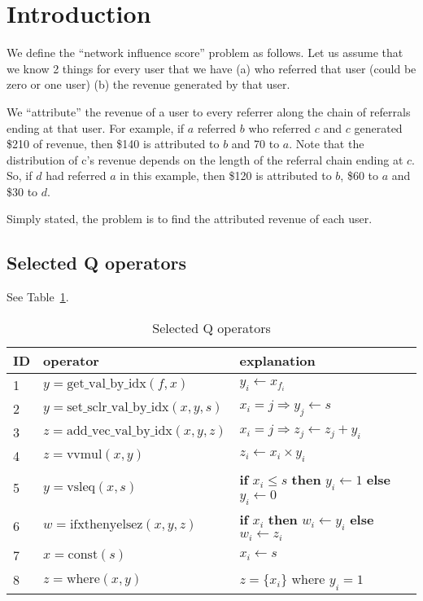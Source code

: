 \section{Introduction}

We define the ``network influence score'' problem as follows. Let us assume that
we know 2 things for every user that we have (a) who referred that user (could
be zero or one user) (b) the revenue generated by that user. 

We ``attribute''
the revenue of a user to every referrer along the chain of referrals ending at
that user. For example, if \(a\) referred \(b\) who referred \(c\) and \(c\)
generated \$210 of revenue, then \$140 is attributed to \(b\) and 70 to \(a\).
Note that the distribution of c's revenue depends on the length of the referral
chain ending at \(c\). So, if \(d\) had referred \(a\) in this example, then
\$120 is attributed to \(b\), \$60 to \(a\) and \$30 to \(d\). 

Simply stated, the problem is to find the attributed revenue of each user.

\subsection{Selected Q operators}
See Table~\ref{tbl_q_ops}.

\begin{table}[ht]
\centering
\begin{tabular}{|l|l|l|} \hline \hline
{\bf ID} & {\bf operator} & {\bf explanation} \\ \hline \hline
1 & \(y = \mathrm{get\_val\_by\_idx}(f, x)\) & \(y_i \leftarrow x_{f_i}\) \\ \hline
2 & \(y = \mathrm{set\_sclr\_val\_by\_idx}(x, y, s)\) & \(x_i = j \Rightarrow y_j \leftarrow s\) \\ \hline
3 & \(z = \mathrm{add\_vec\_val\_by\_idx}(x, y, z)\) & \(x_i = j \Rightarrow z_j \leftarrow
z_j + y_i\) \\ \hline
4 & \(z = \mathrm{vvmul}(x, y)\) & \(z_i \leftarrow x_i \times y_i\) \\ \hline
5 & \(y = \mathrm{vsleq}(x, s)\) & {\bf if} \(x_i \leq s\) {\bf then} \(y_i \leftarrow 1\) {\bf else} \(y_i \leftarrow 0\)  \\ \hline
6 & \(w = \mathrm{ifxthenyelsez}(x, y,z)\) & {\bf if} \(x_i\) {\bf then} \(w_i \leftarrow y_i\) {\bf else} \(w_i \leftarrow z_i\)  \\ \hline
7 & \(x = \mathrm{const}(s)\) & \(x_i \leftarrow s\) \\ \hline
8 & \(z = \mathrm{where}(x, y)\) & \(z = \{x_i\}\) where \(y_i = 1\) \\ \hline
\hline
\end{tabular}
\caption{Selected Q operators}
\label{tbl_q_ops}
\end{table}


